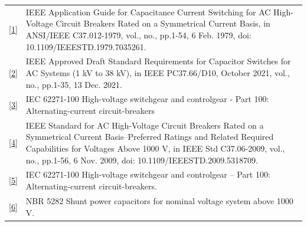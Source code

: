 \documentclass[a4paper]{article}
\begin{document}
	\noindent
	\begin{tabular}{p{0.2cm} p{15.8cm}}
		\href{https://ieeexplore.ieee.org/document/7035261}{[1]} &
		\begin{minipage}[t]{15.8cm}
			IEEE Application Guide for Capacitance Current Switching for AC High-Voltage Circuit Breakers Rated on a Symmetrical Current Basis, in ANSI/IEEE C37.012-1979, vol., no., pp.1-54, 6 Feb. 1979, doi: 10.1109/IEEESTD.1979.7035261.
		\end{minipage} \\
		
		\href{https://ieeexplore.ieee.org/document/9574631}{[2]} &
		\begin{minipage}[t]{15.8cm}
			IEEE Approved Draft Standard Requirements for Capacitor Switches for AC Systems (1 kV to 38 kV), in IEEE PC37.66/D10, October 2021, vol., no., pp.1-35, 13 Dec. 2021.
		\end{minipage} \\
		
		
		\href{https://webstore.iec.ch/publication/62785}{[3]} &
		\begin{minipage}[t]{15.8cm}
			IEC 62271-100 High-voltage switchgear and controlgear - Part 100: Alternating-current circuit-breakers
		\end{minipage} \\
		
		\href{https://ieeexplore.ieee.org/document/5318709}{[4]} &
		\begin{minipage}[t]{15.8cm}
			IEEE Standard for AC High-Voltage Circuit Breakers Rated on a Symmetrical Current Basis--Preferred Ratings and Related Required Capabilities for Voltages Above 1000 V, in IEEE Std C37.06-2009, vol., no., pp.1-56, 6 Nov. 2009, doi: 10.1109/IEEESTD.2009.5318709.
		\end{minipage} \\
		
		\href{https://cdn.standards.iteh.ai/samples/101972/4e7e06bd66d2443da668b8e0c6c60512/IEC-62271-100-2021.pdf}{[5]} &
		\begin{minipage}[t]{15.8cm}
			IEC 62271-100 High-voltage switchgear and controlgear – Part 100: Alternating-current circuit-breakers.
		\end{minipage} \\
		
		\href{https://www.normas.com.br/autorizar/visualizacao-nbr/313/identificar/visitante}{[6]} &
		\begin{minipage}[t]{15.8cm}
			NBR 5282 Shunt power capacitors for nominal voltage system above 1000 V.
		\end{minipage} \\
	\end{tabular}
	
\end{document}
